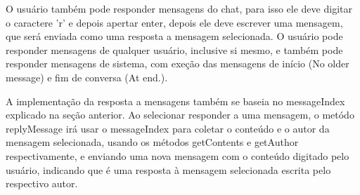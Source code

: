 \documentclass[../main.tex]{subfiles}
\begin{document}
O usuário também pode responder mensagens do chat, para isso ele deve digitar o caractere 'r' e depois apertar enter, depois ele deve escrever uma mensagem, que será enviada como uma resposta a mensagem selecionada. O usuário pode responder mensagens de qualquer usuário, inclusive si mesmo, e também pode responder mensagens de sistema, com exeção das mensagens de início (No older message) e fim de conversa (At end.).

A implementação da resposta a mensagens também se baseia no messageIndex explicado na seção anterior. Ao selecionar responder a uma mensagem, o metódo replyMessage irá usar o messageIndex para coletar o conteúdo e o autor da mensagem selecionada, usando os métodos getContents e getAuthor respectivamente, e enviando uma nova mensagem com o conteúdo digitado pelo usuário, indicando que é uma resposta à mensagem selecionada escrita pelo respectivo autor.
\end{document}
